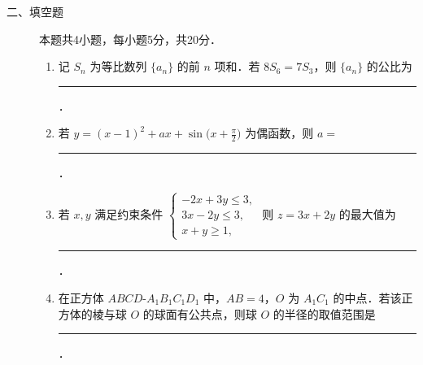 \begin{description}
    \item[二、填空题] 本题共4小题，每小题5分，共20分．
    \begin{enumerate}[leftmargin=5pt]
      \addtocounter{enumi}{+12}
        \item 记 $S_n$ 为等比数列 $\{a_n\}$ 的前 $n$ 项和．若 $8S_6=7S_3$，则 $\{a_n\}$ 的公比为 \rule[-0.3ex]{3em}{0.4pt}．
        \item 若 $y=(x-1)^2+ax+\sin\bigl(x+\frac{\pi}{2}\bigr)$ 为偶函数，则 $a=$ \rule[-0.3ex]{3em}{0.4pt}．
        \item 若 $x,y$ 满足约束条件 $\begin{cases}-2x+3y\leqslant3,\\3x-2y\leqslant3,\\x+y\geqslant1,\end{cases}$ 则 $z=3x+2y$ 的最大值为 \rule[-0.3ex]{3em}{0.4pt}．
        \item 在正方体 $ABCD$-$A_1B_1C_1D_1$ 中，$AB=4$，$O$ 为 $A_1C_1$ 的中点．若该正方体的棱与球 $O$ 的球面有公共点，则球 $O$ 的半径的取值范围是 \rule[-0.3ex]{3em}{0.4pt}．
    \end{enumerate}
\end{description}

